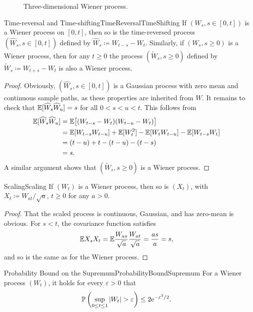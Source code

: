 \begin{figure}[H]
	\centering
	
	\caption{Three-dimensional Wiener process.}
	\label{fig:threeDimensionalBrownianMotionRealisations}
\end{figure}

\begin{thm}{Time-reversal and Time-shifting}{TimeReversalTimeShifting}
	If $(W_s, s \in [0, t])$ is a Wiener process on $[0, t]$, then so is the time-reversed process $(\widehat{W}_s, s \in [0, t])$ defined by $\widehat{W}_s \coloneqq W_{t-s} - W_t$. Similarly, if $(W_s, s \ge 0)$ is a Wiener process, then for any $t \ge 0$ the process $(\widetilde{W}_s, s \ge 0)$ defined by $\widetilde{W}_s \coloneqq W_{t+s} - W_t$ is also a Wiener process.
\end{thm}

\begin{proof}
	Obviously, $(\widehat{W}_s, s \in [0, t])$ is a Gaussian process with zero mean and continuous sample paths, as these properties are inherited from $W$. It remains to check that $\mathbb{E}[\widehat{W}_s \widehat{W}_u] = s$ for all $0 < s < u < t$. This follows from
	\begin{align*}
		\mathbb{E}[\widehat{W}_s \widehat{W}_u]
		 & = \mathbb{E}\big[(W_{t-s} - W_t)(W_{t-u} - W_t)\big]                          \\
		 & = \mathbb{E}[W_{t-s} W_{t-u}] + \mathbb{E}[W_t^2] - \mathbb{E}[W_t W_{t-u}] - \mathbb{E}[W_{t-s} W_t] \\
		 & = (t - u) + t - (t - u) - (t - s)                                     \\
		 & = s.
	\end{align*}
	A similar argument shows that $(\widetilde{W}_s, s \ge 0)$ is a Wiener process.
\end{proof}

\begin{thm}{Scaling}{Scaling}
	If $(W_t)$ is a Wiener process, then so is $(X_t)$, with $X_t \coloneqq W_{at}/\sqrt{a}$, $t \ge 0$ for any $a > 0$.
\end{thm}

\begin{proof}
	That the scaled process is continuous, Gaussian, and has zero-mean is obvious. For $s < t$, the covariance function satisfies$$\mathbb{E} X_s X_t = \mathbb{E} \frac{W_{as}}{\sqrt{a}} \frac{W_{at}}{\sqrt{a}} = \frac{as}{a} = s,$$and so is the same as for the Wiener process.
\end{proof}

\begin{lem}{Probability Bound on the Supremum}{ProbabilityBoundSupremum}
	For a Wiener process $(W_t)$, it holds for every $\varepsilon > 0$ that
	\begin{equation*}
		\mathbb{P} \left( \sup_{0 \le t \le 1} |W_t| > \varepsilon \right) \le 2 \mathrm{e}^{-\varepsilon^2/2}.
	\end{equation*}
\end{lem}


